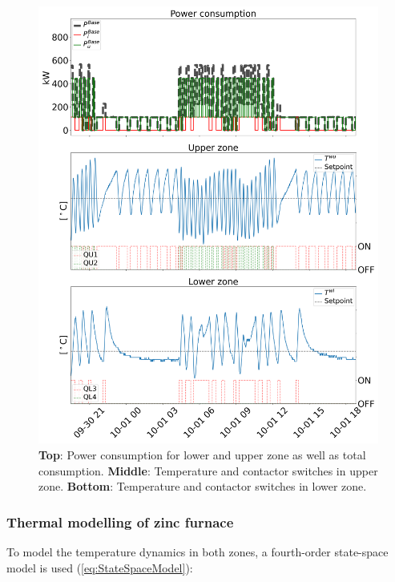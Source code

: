 \documentclass[lettersize,journal]{IEEEtran}
\begin{document}
\begin{figure}[t]
    \centering
    \includegraphics[width=\columnwidth]{figures/data_visualization.png}
    \caption{\textbf{Top}: Power consumption for lower and upper zone as well as total consumption. \textbf{Middle}: Temperature and contactor switches in upper zone. \textbf{Bottom}: Temperature and contactor switches in lower zone.}
    \label{fig:data_visualization}
\end{figure}

\subsubsection{Thermal modelling of zinc furnace}

To model the temperature dynamics in both zones, a fourth-order state-space model is used (\ref{eq:StateSpaceModel}):
\end{document}

